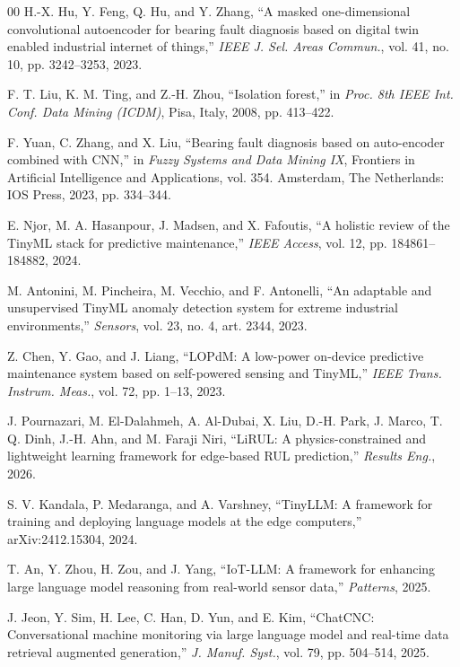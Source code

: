 \documentclass[conference]{IEEEtran}
\begin{document}
\begin{thebibliography}{00}
H.-X. Hu, Y. Feng, Q. Hu, and Y. Zhang, ``A masked one-dimensional
convolutional autoencoder for bearing fault diagnosis based on digital twin
enabled industrial internet of things,'' \textit{IEEE J. Sel. Areas
Commun.}, vol. 41, no. 10, pp. 3242--3253, 2023.

F. T. Liu, K. M. Ting, and Z.-H. Zhou, ``Isolation forest,'' in \textit{Proc.
8th IEEE Int. Conf. Data Mining (ICDM)}, Pisa, Italy, 2008, pp. 413--422.

F. Yuan, C. Zhang, and X. Liu, ``Bearing fault diagnosis based on
auto-encoder combined with CNN,'' in \textit{Fuzzy Systems and Data Mining
IX}, Frontiers in Artificial Intelligence and Applications, vol. 354.
Amsterdam, The Netherlands: IOS Press, 2023, pp. 334--344.

E. Njor, M. A. Hasanpour, J. Madsen, and X. Fafoutis, ``A holistic review of
the TinyML stack for predictive maintenance,'' \textit{IEEE Access},
vol. 12, pp. 184861--184882, 2024.

M. Antonini, M. Pincheira, M. Vecchio, and F. Antonelli, ``An adaptable and
unsupervised TinyML anomaly detection system for extreme industrial
environments,'' \textit{Sensors}, vol. 23, no. 4, art. 2344, 2023.

Z. Chen, Y. Gao, and J. Liang, ``LOPdM: A low-power on-device predictive
maintenance system based on self-powered sensing and TinyML,'' \textit{IEEE
Trans. Instrum. Meas.}, vol. 72, pp. 1--13, 2023.

J. Pournazari, M. El-Dalahmeh, A. Al-Dubai, X. Liu, D.-H. Park, J. Marco,
T. Q. Dinh, J.-H. Ahn, and M. Faraji Niri, ``LiRUL: A physics-constrained
and lightweight learning framework for edge-based RUL prediction,''
\textit{Results Eng.}, 2026.

S. V. Kandala, P. Medaranga, and A. Varshney, ``TinyLLM: A framework for
training and deploying language models at the edge computers,''
arXiv:2412.15304, 2024.

T. An, Y. Zhou, H. Zou, and J. Yang, ``IoT-LLM: A framework for enhancing
large language model reasoning from real-world sensor data,''
\textit{Patterns}, 2025.

J. Jeon, Y. Sim, H. Lee, C. Han, D. Yun, and E. Kim, ``ChatCNC:
Conversational machine monitoring via large language model and real-time
data retrieval augmented generation,'' \textit{J. Manuf. Syst.}, vol. 79,
pp. 504--514, 2025.


\end{thebibliography}
\end{document}
